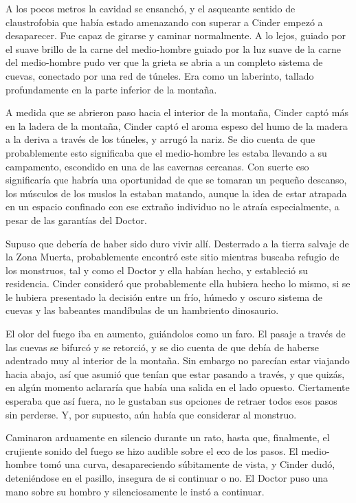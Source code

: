 A los pocos metros la cavidad se ensanchó, y el asqueante sentido de claustrofobia que había estado amenazando con superar a Cinder empezó a desaparecer. Fue capaz de girarse y caminar normalmente. A lo lejos, guiado por el suave brillo de la carne del medio-hombre guiado por la luz suave de la carne del medio-hombre pudo ver que la grieta se abria a un completo sistema de cuevas, conectado por una red de túneles. Era como un laberinto, tallado profundamente en la parte inferior de la montaña.

A medida que se abrieron paso hacia el interior de la montaña, Cinder captó más en la ladera de la montaña, Cinder captó el aroma espeso del humo de la madera a la deriva a través de los túneles, y arrugó la nariz. Se dio cuenta de que probablemente esto significaba que el medio-hombre les estaba llevando a su campamento, escondido en una de las cavernas cercanas. Con suerte eso significaría que habría una oportunidad de que se tomaran un pequeño descanso, los músculos de los muslos la estaban matando, aunque la idea de estar atrapada en un espacio confinado con ese extraño individuo no le atraía especialmente, a pesar de las garantías del Doctor.

Supuso que debería de haber sido duro vivir allí. Desterrado a la tierra salvaje de la Zona Muerta, probablemente encontró este sitio mientras buscaba refugio de los monstruos, tal y como el Doctor y ella habían hecho, y estableció su residencia. Cinder consideró que probablemente ella hubiera hecho lo mismo, si se le hubiera presentado la decisión entre un frío, húmedo y oscuro sistema de cuevas y las babeantes mandíbulas de un hambriento dinosaurio.

El olor del fuego iba en aumento, guiándolos como un faro. El pasaje a través de las cuevas se bifurcó y se retorció, y se dio cuenta de que debía de haberse adentrado muy al interior de la montaña. Sin embargo no parecían estar viajando hacia abajo, así que asumió que tenían que estar pasando a través, y que quizás, en algún momento aclararía que había una salida en el lado opuesto. Ciertamente esperaba que así fuera, no le gustaban sus opciones de retraer todos esos pasos sin perderse. Y, por supuesto, aún había que considerar al monstruo.

Caminaron arduamente en silencio durante un rato, hasta que, finalmente, el crujiente sonido del fuego se hizo audible sobre el eco de los pasos. El medio-hombre tomó una curva, desapareciendo súbitamente de vista, y Cinder dudó, deteniéndose en el pasillo, insegura de si continuar o no. El Doctor puso una mano sobre su hombro y silenciosamente le instó a continuar.

